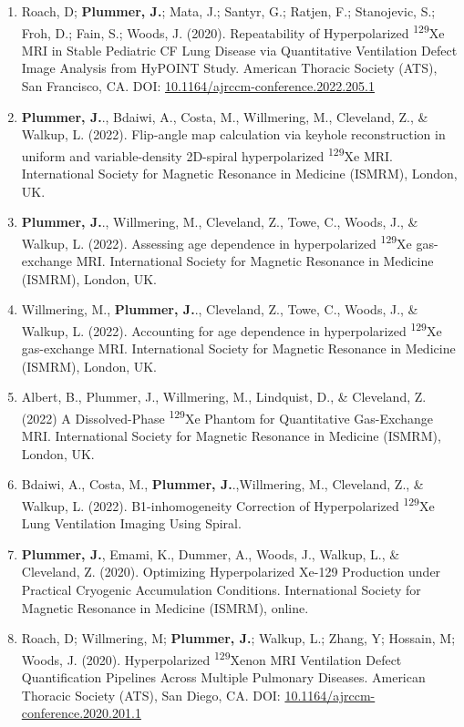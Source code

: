 \documentclass[12pt,]{scrartcl}
\begin{document}
\begin{enumerate}
  \item Roach, D; \textbf{ Plummer, J.}; Mata, J.; Santyr, G.; Ratjen, F.; Stanojevic, S.; Froh, D.; Fain, S.; Woods, J. (2020). Repeatability of Hyperpolarized \textsuperscript{129}Xe MRI in Stable Pediatric CF Lung Disease via Quantitative Ventilation Defect Image Analysis from HyPOINT Study. American Thoracic Society (ATS), San Francisco, CA. DOI: \href{https://www.atsjournals.org/doi/abs/10.1164/ajrccm-conference.2022.205.1_MeetingAbstracts.A2555}{10.1164/ajrccm-conference.2022.205.1}
  \item \textbf{Plummer, J.}., Bdaiwi, A., Costa, M., Willmering, M., Cleveland, Z., \& Walkup, L. (2022). Flip-angle map calculation via keyhole reconstruction in uniform and variable-density 2D-spiral hyperpolarized \textsuperscript{129}Xe MRI. International Society for Magnetic Resonance in Medicine (ISMRM), London, UK.
  \item \textbf{Plummer, J.}., Willmering, M., Cleveland, Z., Towe, C., Woods, J., \& Walkup, L. (2022). Assessing age dependence in hyperpolarized \textsuperscript{129}Xe gas-exchange MRI. International Society for Magnetic Resonance in Medicine (ISMRM), London, UK.
  \item  Willmering, M., \textbf{Plummer, J.}., Cleveland, Z., Towe, C., Woods, J., \& Walkup, L. (2022). Accounting for age dependence in hyperpolarized \textsuperscript{129}Xe gas-exchange MRI. International Society for Magnetic Resonance in Medicine (ISMRM), London, UK.
  \item Albert, B., Plummer, J., Willmering, M., Lindquist, D., \& Cleveland, Z. (2022) A Dissolved-Phase \textsuperscript{129}Xe Phantom for Quantitative Gas-Exchange MRI. International Society for Magnetic Resonance in Medicine (ISMRM), London, UK.
  \item  Bdaiwi, A., Costa, M., \textbf{Plummer, J.}.,Willmering, M., Cleveland, Z., \& Walkup, L. (2022). B1-inhomogeneity Correction of Hyperpolarized \textsuperscript{129}Xe Lung Ventilation Imaging Using Spiral.
  \item \textbf{Plummer, J.}, Emami, K., Dummer, A., Woods, J., Walkup, L., \& Cleveland, Z. (2020). Optimizing Hyperpolarized Xe-129 Production under Practical Cryogenic Accumulation Conditions. International Society for Magnetic Resonance in Medicine (ISMRM), online.   
  \item Roach, D; Willmering, M;\textbf{ Plummer, J.}; Walkup, L.; Zhang, Y; Hossain, M; Woods, J. (2020). Hyperpolarized \textsuperscript{129}Xenon MRI Ventilation Defect Quantification Pipelines Across Multiple Pulmonary Diseases. American Thoracic Society (ATS), San Diego, CA. DOI: \href{https://www.atsjournals.org/doi/pdf/10.1164/ajrccm-conference.2020.201.1_MeetingAbstracts.A7893}{10.1164/ajrccm-conference.2020.201.1}

\end{enumerate}
\end{document}
